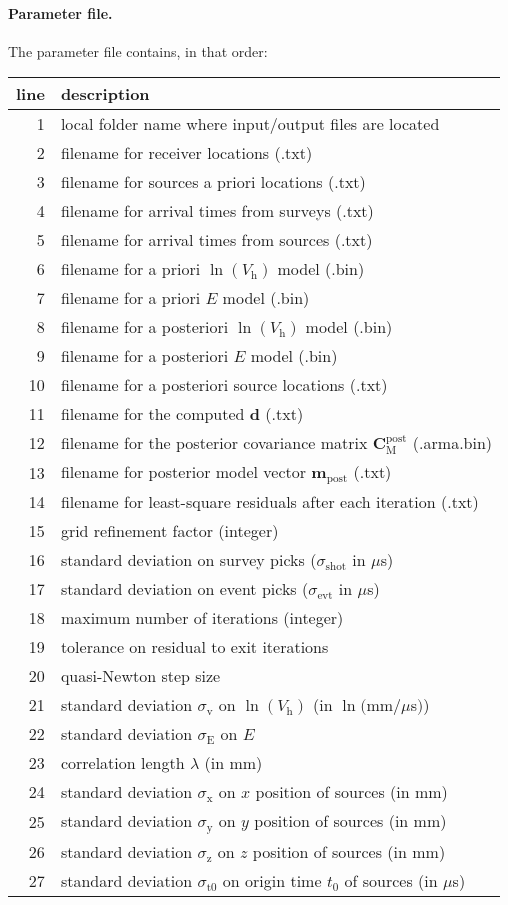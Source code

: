 \documentclass{article}
\renewcommand\vec[1]{\mathbf{#1}}
\newcommand\mat[1]{\mathbf{#1}}
\begin{document}
\paragraph{Parameter file.} The parameter file contains, in that order:\\
\begin{tabular}{rl}
  \hline
  line & description \\ \hline
  1 & local folder name where input/output files are located \\
  2 & filename for receiver locations (.txt)\\
  3 & filename for sources a priori locations (.txt) \\
  4 & filename for arrival times from surveys (.txt) \\
  5 & filename for arrival times from sources (.txt)\\
  6 & filename for a priori $\ln(V_\mathrm{h})$ model (.bin) \\
  7 & filename for a priori $E$ model (.bin)\\
  8 & filename for a posteriori $\ln(V_\mathrm{h})$ model (.bin) \\
  9 & filename for a posteriori $E$ model (.bin)\\
  10 & filename for a posteriori source locations (.txt) \\
  11 & filename for the computed $\vec{d}$ (.txt)\\
  12 & filename for the posterior covariance matrix $\mat{C}_\mathrm{M}^\mathrm{post}$ (.arma.bin)\\
  13 & filename for posterior model vector $\vec{m}_\mathrm{post}$ (.txt) \\
  14 & filename for least-square residuals after each iteration (.txt)\\
  15 & grid refinement factor (integer) \\
  16 & standard deviation on survey picks ($\sigma_\mathrm{shot}$ in $\mu$s) \\
  17 & standard deviation on event picks ($\sigma_\mathrm{evt}$ in $\mu$s) \\
  18 & maximum number of iterations (integer) \\
  19 & tolerance on residual to exit iterations \\
  20 & quasi-Newton step size \\
  21 & standard deviation $\sigma_\mathrm{v}$ on $\ln(V_\mathrm{h})$ (in $\ln($mm/$\mu$s$)$) \\
  22 & standard deviation $\sigma_\mathrm{E}$ on $E$ \\
  23 & correlation length $\lambda$ (in mm) \\
  24 & standard deviation $\sigma_\mathrm{x}$ on $x$ position of sources (in mm) \\
  25 & standard deviation $\sigma_\mathrm{y}$ on $y$ position of sources (in mm) \\
  26 & standard deviation $\sigma_\mathrm{z}$ on $z$ position of sources (in mm)\\
  27 & standard deviation $\sigma_\mathrm{t0}$ on origin time $t_0$ of sources (in $\mu$s)\\
  \hline
\end{tabular}
\end{document}

